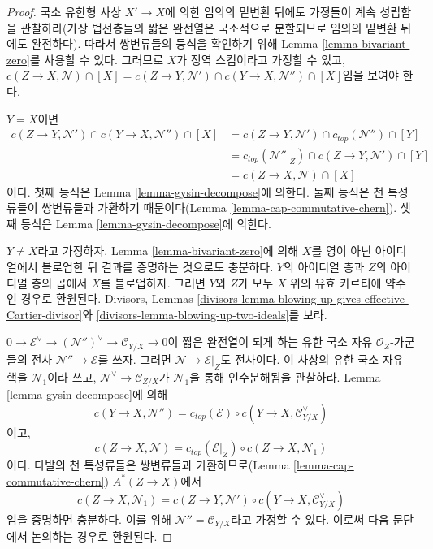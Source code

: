 \begin{proof}
국소 유한형 사상 $X' \to X$에 의한 임의의 밑변환 뒤에도 가정들이
계속 성립함을 관찰하라(가상 법선층들의 짧은 완전열은 국소적으로
분할되므로 임의의 밑변환 뒤에도 완전하다). 따라서 쌍변류들의 등식을
확인하기 위해 Lemma \ref{lemma-bivariant-zero}를 사용할 수 있다.
그러므로 $X$가 정역 스킴이라고 가정할 수 있고,
$c(Z \to X, \mathcal{N}) \cap [X] =
c(Z \to Y, \mathcal{N}') \cap c(Y \to X, \mathcal{N}'') \cap [X]$임을
보여야 한다.

\medskip\noindent
$Y = X$이면
\begin{align*}
c(Z \to Y, \mathcal{N}') \cap c(Y \to X, \mathcal{N}'') \cap [X]
& =
c(Z \to Y, \mathcal{N}') \cap c_{top}(\mathcal{N}'') \cap [Y] \\
& =
c_{top}(\mathcal{N}''|_Z) \cap c(Z \to Y, \mathcal{N}') \cap [Y] \\
& =
c(Z \to X, \mathcal{N}) \cap [X] 
\end{align*}
이다. 첫째 등식은 Lemma \ref{lemma-gysin-decompose}에 의한다.
둘째 등식은 천 특성류들이 쌍변류들과 가환하기 때문이다(Lemma
\ref{lemma-cap-commutative-chern}). 셋째 등식은 Lemma
\ref{lemma-gysin-decompose}에 의한다.

\medskip\noindent
$Y \not = X$라고 가정하자. Lemma \ref{lemma-bivariant-zero}에 의해
$X$를 영이 아닌 아이디얼에서 블로업한 뒤 결과를 증명하는 것으로도
충분하다. $Y$의 아이디얼 층과 $Z$의 아이디얼 층의 곱에서 $X$를
블로업하자. 그러면 $Y$와 $Z$가 모두 $X$ 위의 유효 카르티에 약수인
경우로 환원된다. Divisors, Lemmas
\ref{divisors-lemma-blowing-up-gives-effective-Cartier-divisor}와
\ref{divisors-lemma-blowing-up-two-ideals}를 보라.

\medskip\noindent
$0 \to \mathcal{E}^\vee \to (\mathcal{N}'')^\vee \to \mathcal{C}_{Y/X} \to 0$이
짧은 완전열이 되게 하는 유한 국소 자유 $\mathcal{O}_Z$-가군들의
전사 $\mathcal{N}'' \to \mathcal{E}$를 쓰자. 그러면
$\mathcal{N} \to \mathcal{E}|_Z$도 전사이다. 이 사상의 유한 국소
자유 핵을 $\mathcal{N}_1$이라 쓰고,
$\mathcal{N}^\vee \to \mathcal{C}_{Z/X}$가 $\mathcal{N}_1$을 통해
인수분해됨을 관찰하라. Lemma \ref{lemma-gysin-decompose}에 의해
$$
c(Y \to X, \mathcal{N}'') = c_{top}(\mathcal{E}) \circ
c(Y \to X, \mathcal{C}_{Y/X}^\vee)
$$
이고,
$$
c(Z \to X, \mathcal{N}) = c_{top}(\mathcal{E}|_Z) \circ
c(Z \to X, \mathcal{N}_1)
$$
이다. 다발의 천 특성류들은 쌍변류들과 가환하므로(Lemma
\ref{lemma-cap-commutative-chern}) $A^*(Z \to X)$에서
$$
c(Z \to X, \mathcal{N}_1) =
c(Z \to Y, \mathcal{N}') \circ c(Y \to X, \mathcal{C}_{Y/X}^\vee)
$$
임을 증명하면 충분하다. 이를 위해 $\mathcal{N}'' = \mathcal{C}_{Y/X}$라고
가정할 수 있다. 이로써 다음 문단에서 논의하는 경우로 환원된다.


\end{proof}
